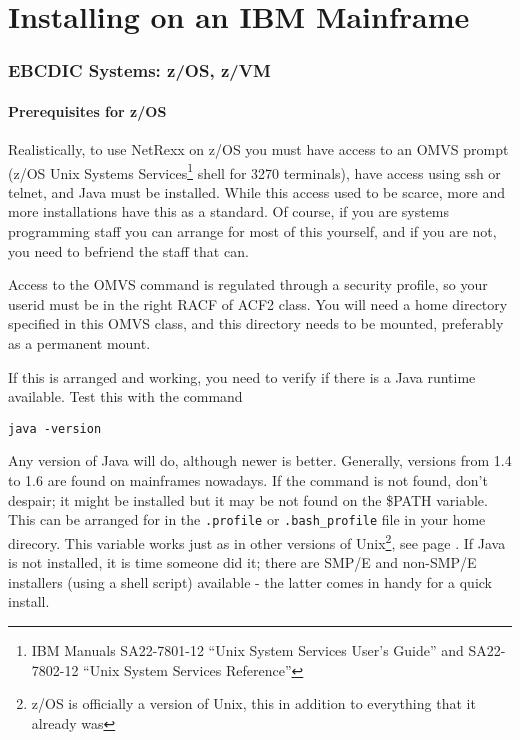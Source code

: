 \chapter{Installing on an IBM Mainframe}
\subsection{EBCDIC Systems: z/OS, z/VM}

\subsubsection{Prerequisites for z/OS}
Realistically, to use NetRexx on z/OS you must have access to an OMVS
prompt (z/OS Unix Systems Services\footnote{IBM Manuals SA22-7801-12 ``Unix System
  Services User's Guide''
  and  SA22-7802-12 ``Unix System Services Reference''}  shell for 3270 terminals), have
access using ssh or telnet, and Java must be installed. While this
access used to be scarce, more and more installations have this as a
standard. Of course, if you are systems programming staff you can
arrange for most of this yourself, and if you are not, you need to
befriend the staff that can.

Access to the OMVS command is regulated through a security profile, so your userid
must be in the right RACF of ACF2 class. You will need a home
directory specified in this OMVS class, and this directory needs to be
mounted, preferably as a permanent mount.

If this is arranged and working, you need to verify if there is a Java
runtime available. Test this with the command 
\begin{verbatim}
java -version
\end{verbatim}
Any version of Java will do, although newer is better. Generally,
versions from 1.4 to 1.6 are found on mainframes nowadays. If the
command is not found, don't despair; it might be installed but it may
be not found on the \$PATH variable. This can be arranged for in the
\texttt{.profile} or \texttt{.bash\_profile} file in your home direcory. This variable works
just as in other versions of Unix\footnote{z/OS is officially a
  version of Unix, this in addition to everything that it already was}, see
page \pageref{install_classpath}. If Java is not installed, it is time
someone did it; there are SMP/E and non-SMP/E installers (using a
shell script) available -
the latter comes in handy for a quick install.

